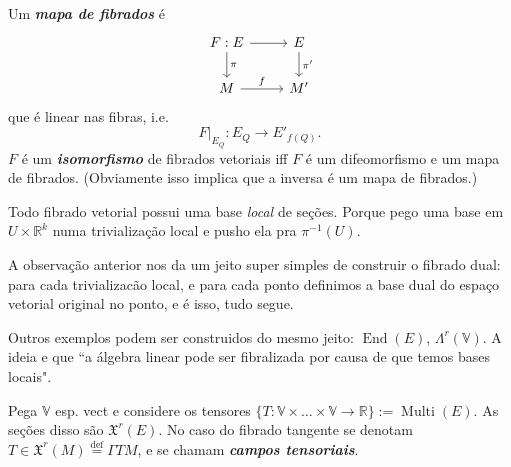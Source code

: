 \begin{defn}\leavevmode
Um \textit{\textbf{mapa de fibrados}} é
\[\begin{tikzcd}
	F: E\arrow[r]\arrow[d,"\pi"]&  E \arrow[d,"\pi'"]\\
	M \arrow[r,"f"]& M'
\end{tikzcd}\]
que é linear nas fibras, i.e.
 \[F|_{E_Q}: E_Q \to E'_{f(Q)}.\]
 \(F\) é um \textit{\textbf{isomorfismo}} de fibrados vetoriais iff \(F\) é um difeomorfismo e um mapa de fibrados. (Obviamente isso implica que a inversa é um mapa de fibrados.)
\end{defn}
\begin{remark}\leavevmode
Todo fibrado vetorial possui uma base \textit{local} de seções. Porque pego uma base em \(U \times \mathbb{R}^k\) numa trivialização local e pusho ela pra \(\pi^{-1}(U)\).
\end{remark}

\begin{example}\leavevmode
A observação anterior nos da um jeito super simples de construir o fibrado dual: para cada trivializacão local, e para cada ponto definimos a base dual do espaço vetorial original no ponto, e é isso, tudo segue.

Outros exemplos podem ser construidos do mesmo jeito: \(\operatorname{End}(E)\), \(\Lambda^{r}(\mathbb{V})\). A ideia e que ``a álgebra linear pode ser fibralizada por causa de que temos bases locais".
\end{example}


\begin{example}[Tensores=aplicações multilineares]\leavevmode
Pega \(\mathbb{V}\) esp. vect e considere os tensores \(\{T: \mathbb{V} \times \ldots \times\mathbb{V} \to \mathbb{R}\}:=\operatorname{Multi}(E)\). As seções disso são \(\mathfrak{X}^r(E)\). No caso do fibrado tangente se denotam \(T \in \mathfrak{X}^r(M)\overset{\operatorname{def}}{=}\Gamma TM\), e se chamam \textit{\textbf{campos tensoriais}}.
\end{example}

